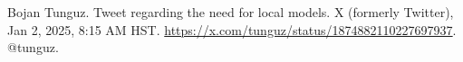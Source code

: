 \documentclass[12pt, a4paper]{article}
\begin{document}
\begin{thebibliography}{9} %

Bojan Tunguz.
{Tweet regarding the need for local models}.
X (formerly Twitter),
Jan 2, 2025, 8:15 AM HST.
\href{https://x.com/tunguz/status/1874882110227697937}{https://x.com/tunguz/status/1874882110227697937}.
@tunguz.

\end{thebibliography}
\end{document}
